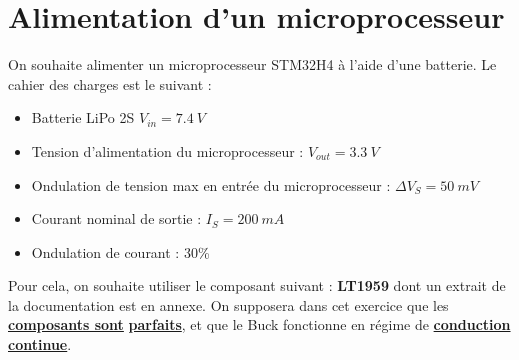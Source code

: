\chapter{Alimentation d’un microprocesseur}

On souhaite alimenter un microprocesseur STM32H4 à l'aide d'une batterie. Le cahier des charges est le suivant :

\begin{itemize}
\item Batterie LiPo 2S $V_{in} = 7.4\ V$
\item Tension d’alimentation du microprocesseur : $V_{out}=3.3\ V$
\item Ondulation de tension max en entrée du microprocesseur : $\Delta V_S = 50\ mV$
\item Courant nominal de sortie : $I_S = 200\ mA$
\item Ondulation de courant : 30\%
\end{itemize}

Pour cela, on souhaite utiliser le composant suivant : \textbf{LT1959} dont un extrait de la documentation est en annexe. On supposera dans cet exercice que les \underline{\textbf{composants sont}} \underline{\textbf{parfaits}}, et que le Buck fonctionne en régime de \underline{\textbf{conduction continue}}.

